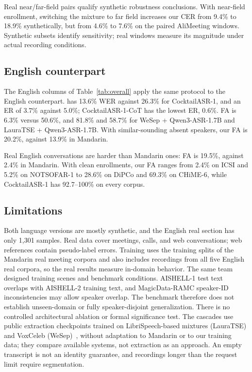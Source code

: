 Real near/far-field pairs qualify synthetic robustness conclusions.
With near-field enrollment, switching the mixture to far field increases our CER from 9.4\% to 18.9\% synthetically, but from 4.6\% to 7.6\% on the paired AliMeeting windows.
Synthetic subsets identify sensitivity; real windows measure its magnitude under actual recording conditions.

\subsection{English counterpart}
The English columns of Table~\ref{tab:overall} apply the same protocol to the English counterpart.
\model has 13.6\% WER against 26.3\% for CocktailASR-1, and an ER of 3.7\% against 5.0\%; CocktailASR-1-CoT has the lowest ER, 0.6\%.
FA is 6.3\% versus 50.6\%, and 81.8\% and 58.7\% for WeSep + Qwen3-ASR-1.7B and LauraTSE + Qwen3-ASR-1.7B.
With similar-sounding absent speakers, our FA is 20.2\%, against 13.9\% in Mandarin.

Real English conversations are harder than Mandarin ones: FA is 19.5\%, against 2.4\% in Mandarin.
With clean enrollments, our FA ranges from 2.4\% on ICSI and 5.2\% on NOTSOFAR-1 to 28.6\% on DiPCo and 69.3\% on CHiME-6, while CocktailASR-1 has 92.7--100\% on every corpus.

\subsection{Limitations}
Both language versions are mostly synthetic, and the English real section has only 1{,}301 samples.
Real data cover meetings, calls, and web conversations; web references contain pseudo-label errors.
Training uses the training splits of the Mandarin real meeting corpora and also includes recordings from all five English real corpora, so the real results measure in-domain behavior.
The same team designed training scenes and benchmark conditions.
AISHELL-1 test text overlaps with AISHELL-2 training text, and MagicData-RAMC speaker-ID inconsistencies may allow speaker overlap.
The benchmark therefore does not establish unseen-domain or fully speaker-disjoint generalization.
There is no controlled architectural ablation or formal significance test.
The cascades use public extraction checkpoints trained on LibriSpeech-based mixtures (LauraTSE) and VoxCeleb (WeSep)~\cite{tang2025lauratse}, without adaptation to Mandarin or to our training data; they compare available systems, not extraction as an approach.
An empty transcript is not an identity guarantee, and recordings longer than the request limit require segmentation.
